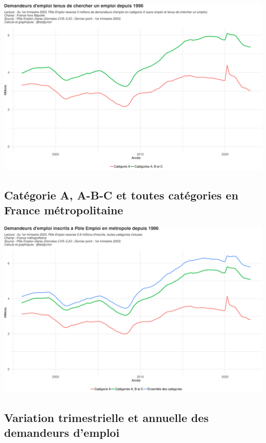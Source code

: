 \documentclass[
  paper=a4,
  ,captions=tableheading
]{scrartcl}
\begin{document}
\includegraphics{rapport_pdf_demandeurs_emploi_pole_emploi_files/figure-latex/unnamed-chunk-2-1.pdf}

\hypertarget{catuxe9gorie-a-a-b-c-et-toutes-catuxe9gories-en-france-muxe9tropolitaine}{%
\subsection{Catégorie A, A-B-C et toutes catégories en France
métropolitaine}\label{catuxe9gorie-a-a-b-c-et-toutes-catuxe9gories-en-france-muxe9tropolitaine}}

\includegraphics{rapport_pdf_demandeurs_emploi_pole_emploi_files/figure-latex/unnamed-chunk-3-1.pdf}

\hypertarget{variation-trimestrielle-et-annuelle-des-demandeurs-demploi}{%
\subsection{Variation trimestrielle et annuelle des demandeurs
d'emploi}\label{variation-trimestrielle-et-annuelle-des-demandeurs-demploi}}
\end{document}
